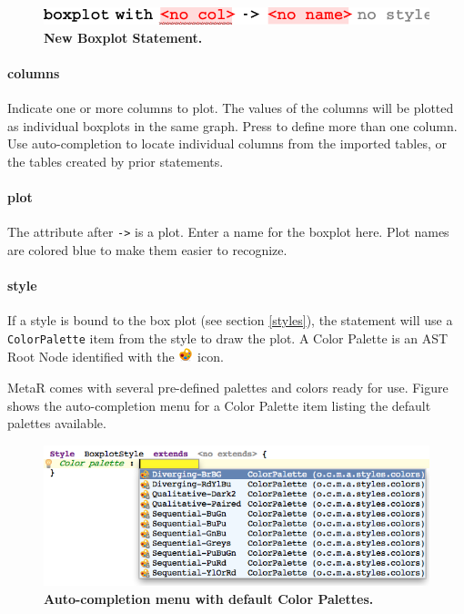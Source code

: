 \begin{figure}
  \centering
  \includegraphics[width=\figWidthNarrow]{figures/NewBoxplot.pdf}
\caption[New Boxplot Statement.]{\textbf{New Boxplot Statement.}}
\label{fig:NewBoxPlot}
\end{figure}

\paragraph{columns}
Indicate one or more columns to plot. The values of the columns will be plotted as individual boxplots in the same graph. Press \keys{\enter} to define more than one column. Use auto-completion to locate individual columns from the imported tables, or the tables created by prior statements. 

\paragraph{plot}
The attribute after \texttt{->} is a plot. Enter a name for the boxplot here. Plot names are colored blue to make them easier to recognize.

\paragraph{style} \label{ColorPaletteDesc}
If a style is bound to the box plot (see section \ref{styles}),  the statement will use a \texttt{Color\allowbreak{}Palette} item from the style to draw the plot. A Color Palette is an AST Root Node identified with the  \includegraphics[height=2ex]{figures/palette.png} icon. 

MetaR comes with several pre-defined palettes and colors ready for use. Figure shows the auto-completion menu for a Color Palette item listing the default palettes available.

\begin{figure}[h!tbp]
  \centering
  \includegraphics[width=\figWidthWide]{figures/ColorPaletteItem.png}
\caption[Color Palette Item.]{\textbf{Auto-completion menu with default Color Palettes.}}
\label{fig:ColorPaletteItem}
\end{figure}

